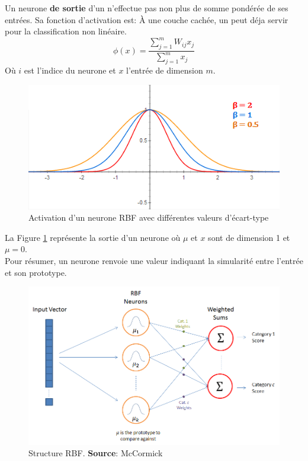 Un neurone \textbf{de sortie} d'un \rbf n'effectue pas non plus de somme pondérée de ses entrées. Sa fonction d'activation est:
À une couche cachée, un \mlp peut déja servir pour la classification non linéaire.\cite{statistica}\\
\begin{equation}\label{eq:sortiephi}
 \phi(x) = \frac{\sum_{j=1}^{m}W_{ij}x_{j}}{\sum_{j=1}^{m}x_{j}}
\end{equation}
Où $i$ est l'indice du neurone et $x$ l'entrée de dimension $m$.
\begin{figure}
 \centering
 \includegraphics[scale=0.7]{../figures/RBFactivation.png}%
 \caption{Activation d'un neurone RBF avec différentes valeurs d'écart-type}
 \label{rbfactivation}
\end{figure}
La Figure \ref{rbfactivation} représente la sortie d'un neurone \rbf où $\mu$ et $x$ sont de dimension 1 et $\mu = 0$.\\
Pour résumer, un neurone \rbf renvoie une valeur indiquant la simularité entre l'entrée et son prototype.
\begin{figure}
 \centering
 \includegraphics[scale=0.5]{../figures/RBFstruct.png}
 \caption{Structure RBF. \textbf{Source}: McCormick\cite{RBFtuto}}
 \label{structurerbf}
\end{figure}
